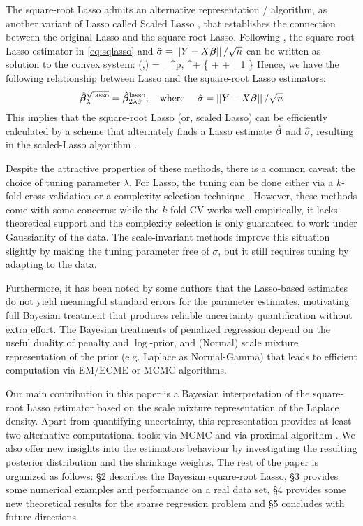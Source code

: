 \documentclass[11pt]{article}
\begin{document}
The square-root Lasso admits an alternative representation / algorithm, as another variant of Lasso called Scaled Lasso \citep{sun2012scaled}, that establishes the connection between the original Lasso and the square-root Lasso. Following \citet{giraud2014introduction},  the square-root Lasso estimator in \eqref{eq:sqlasso} and $\hat{\sigma} = \left|\left|Y-X\boldsymbol{\beta}\right|\right|/\sqrt{n}$ can be written as solution to the convex system:
\beq
(\hat{\bbeta},\hat{\sigma}) = \argmin_{\bbeta \in \Re^p, \sigma \in \Re^+} \left\{  +  + \lambda \norm{\bbeta}_1 \right\}
\eeq
Hence, we have the following relationship between Lasso and the square-root Lasso estimators:
\[
\hat{\boldsymbol{\beta}}_{\lambda}^{\sqrt{\text{lasso}}} = \hat{\boldsymbol{\beta}}_{2\lambda \hat{\sigma}}^{\text{lasso}}, \quad \text{where } \quad \hat{\sigma} = \left|\left|Y-X\boldsymbol{\beta}\right|\right|/\sqrt{n}
\]
This implies that the square-root Lasso (or, scaled Lasso) can be efficiently calculated by a scheme that alternately finds a Lasso estimate $\hat{\boldsymbol{\beta}}$ and $\hat{\sigma}$, resulting in the scaled-Lasso algorithm \citep{sun2012scaled}.  

Despite the attractive properties of these methods, there is a common caveat: the choice of tuning parameter $\lambda$. For Lasso, the tuning can be done either via a $k$-fold cross-validation or a complexity selection technique \citep{giraud2012high}. However, these methods come with some concerns: while the $k$-fold CV works well empirically, it lacks theoretical support and the complexity selection is only guaranteed to work under Gaussianity of the data. The scale-invariant methods improve this situation slightly by making the tuning parameter free of $\sigma$, but it still requires tuning by adapting to the data. 

Furthermore, it has been noted by some authors \citep{chatterjee2011bootstrap} that the Lasso-based estimates do not yield meaningful standard errors for the parameter estimates, motivating full Bayesian treatment that produces reliable uncertainty quantification without extra effort. The Bayesian treatments of penalized regression depend on the useful duality of penalty and $\log$-prior, and (Normal) scale mixture representation of the prior (e.g. Laplace as Normal-Gamma) that leads to efficient computation via EM/ECME or MCMC algorithms.

Our main contribution in this paper is a Bayesian interpretation of the square-root Lasso estimator based on the scale mixture representation of the Laplace density. Apart from quantifying uncertainty, this representation provides at least two alternative computational tools: via MCMC and via proximal algorithm \citep{polson2015proximal}. We also offer new insights into the estimators behaviour by investigating the resulting posterior distribution and the shrinkage weights. The rest of the paper is organized as follows: \S 2 describes the Bayesian square-root Lasso, \S 3 provides some numerical examples and performance on a real data set, \S 4 provides some new theoretical results for the sparse regression problem and \S 5 concludes with future directions.   
\end{document}
